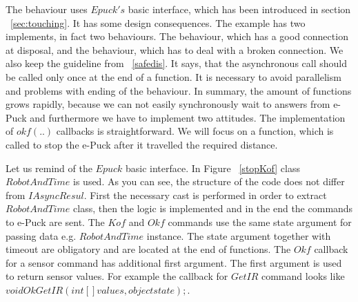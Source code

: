\documentclass[12pt,notitlepage]{report}
\begin{document}
	The behaviour  uses $Epuck's$ basic interface,	which has been introduced in section ~\ref{sec:touching}.
	It has some design consequences. The example has two implements, in fact two behaviours. 
	The behaviour, which has a good connection at disposal,
	and the behaviour, which has to deal with a broken connection.
	We also keep the guideline from ~\ref{safedis}. 
	It says, that the asynchronous call should be called only once at the end of a function.
	It is necessary to avoid parallelism and problems with ending of the behaviour.
	In summary, the amount of functions grows rapidly, because we can not easily synchronously wait to answers from e-Puck
	and furthermore we have to implement two attitudes.
	The implementation of $okf(..)$ callbacks is straightforward. 
	We will focus on a function, which is called to stop the e-Puck after it travelled the required distance.

	Let us remind of the $Epuck$ basic interface.
	In Figure ~\ref{stopKof} class $RobotAndTime$ is used. 
	As you can see, the structure of the code does not differ from $IAsyncResul$. First the necessary cast is performed in order to 
	extract $RobotAndTime$ class, then the logic is implemented and in the end the commands to e-Puck are sent.
	The $Kof$ and $Okf$ commands use the same state argument for passing data e.g. $RobotAndTime$ instance. The state argument together 
	with timeout are obligatory and are located at the end of functions.
	The $Okf$ callback for a sensor command has additional first argument. 
	The first argument is used to return sensor values. For example
	the callback for $GetIR$ command looks like $void OkGetIR(int[] values, object state);$.
	
\end{document}
